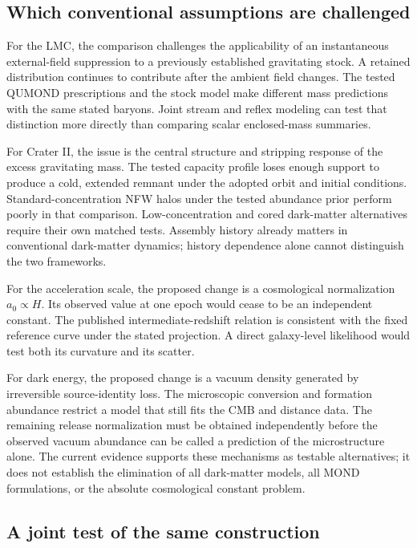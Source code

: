 \subsection{Which conventional assumptions are challenged}

For the LMC, the comparison challenges the applicability of an
instantaneous external-field suppression to a previously established
gravitating stock. A retained distribution continues to contribute after
the ambient field changes. The tested QUMOND prescriptions and the stock
model make different mass predictions with the same stated baryons.
Joint stream and reflex modeling can test that distinction more directly
than comparing scalar enclosed-mass summaries.

For Crater II, the issue is the central structure and stripping response
of the excess gravitating mass. The tested capacity profile loses enough
support to produce a cold, extended remnant under the adopted orbit and
initial conditions. Standard-concentration NFW halos under the tested
abundance prior perform poorly in that comparison. Low-concentration
and cored dark-matter alternatives require their own matched tests.
Assembly history already matters in conventional dark-matter dynamics;
history dependence alone cannot distinguish the two frameworks.

For the acceleration scale, the proposed change is a cosmological
normalization $a_0\propto H$. Its observed value at one epoch would cease
to be an independent constant. The published intermediate-redshift
relation is consistent with the fixed reference curve under the stated
projection. A direct galaxy-level likelihood would test both its curvature
and its scatter.

For dark energy, the proposed change is a vacuum density generated by
irreversible source-identity loss. The microscopic conversion and
formation abundance restrict a model that still fits the CMB and distance
data. The remaining release normalization must be obtained independently
before the observed vacuum abundance can be called a prediction of the
microstructure alone. The current evidence supports these mechanisms as
testable alternatives; it does not establish the elimination of all
dark-matter models, all MOND formulations, or the absolute cosmological
constant problem.

\subsection{A joint test of the same construction}

